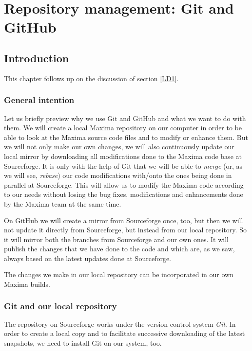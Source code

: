 \documentclass[../Maxima_Workbook.tex]{subfiles}
\begin{document}
	
\chapter{Repository management: Git and GitHub}\label{RM1}

\section{Introduction}

This chapter follows up on the discussion of section \ref{LD1}.

\subsection{General intention}

Let us briefly preview why we use Git and GitHub and what we want to do with them. We will create a local Maxima repository on our computer in order to be able to look at the Maxima source code files and to modify or enhance them. But we will not only make our own changes, we will also continuously update our local mirror by downloading all modifications done to the Maxima code base at Sourceforge. It is only with the help of Git that we will be able to \emph{merge} (or, as we will see, \emph{rebase}) our code modifications with/onto the ones being done in parallel at Sourceforge. This will allow us to modify the Maxima code according to our needs without losing the bug fixes, modifications and enhancements done by the Maxima team at the same time. 

\lz On GitHub we will create a mirror from Sourceforge once, too, but then we will not update it directly from Sourceforge, but instead from our local repository. So it will mirror both the branches from Sourceforge and our own ones. It will publish the changes that we have done to the code and which are, as we saw, always based on the latest updates done at Sourceforge.

\lz The changes we make in our local repository can be incorporated in our own Maxima builds.

\subsection{Git and our local repository}

The repository on Sourceforge works under the version control system \emph{Git}. In order to create a local copy and to facilitate successive downloading of the latest snapshots, we need to install Git on our system, too.
\end{document}
